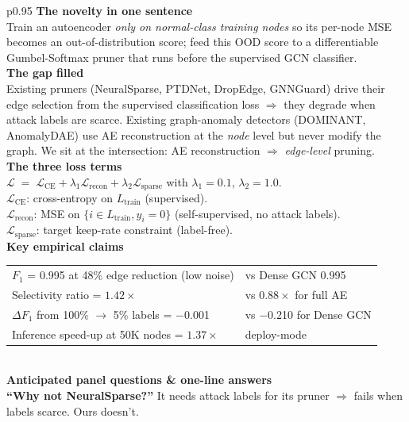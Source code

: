 \documentclass[11pt,a4paper]{article}
\begin{document}
\begin{tabular}{p{}}
\toprule
\textbf{The novelty in one sentence}\\
Train an autoencoder \emph{only on normal-class training nodes} so its
per-node MSE becomes an out-of-distribution score; feed this OOD score
to a differentiable Gumbel-Softmax pruner that runs before the
supervised GCN classifier.\\
\midrule
\textbf{The gap filled}\\
Existing pruners (NeuralSparse, PTDNet, DropEdge, GNNGuard) drive their
edge selection from the supervised classification loss $\Rightarrow$
they degrade when attack labels are scarce. Existing graph-anomaly
detectors (DOMINANT, AnomalyDAE) use AE reconstruction at the
\emph{node} level but never modify the graph. We sit at the
intersection: AE reconstruction $\Rightarrow$ \emph{edge-level}
pruning.\\
\midrule
\textbf{The three loss terms}\\
$\mathcal{L} \;=\; \mathcal{L}_{\text{CE}}
+ \lambda_1 \mathcal{L}_{\text{recon}}
+ \lambda_2 \mathcal{L}_{\text{sparse}}$
\quad with $\lambda_1{=}0.1$, $\lambda_2{=}1.0$.\\[2pt]
$\mathcal{L}_{\text{CE}}$: cross-entropy on $L_{\text{train}}$
(supervised).\\
$\mathcal{L}_{\text{recon}}$: MSE on $\{i\in L_{\text{train}}, y_i=0\}$
(self-supervised, no attack labels).\\
$\mathcal{L}_{\text{sparse}}$: target keep-rate constraint
(label-free).\\
\midrule
\textbf{Key empirical claims}\\
\begin{tabular}{p{}p{}}
$F_1$ = 0.995 at 48\% edge reduction (low noise) & vs Dense GCN 0.995\\
Selectivity ratio = $1.42\times$ & vs $0.88\times$ for full AE\\
$\Delta F_1$ from 100\% $\to$ 5\% labels = $-$0.001 & vs $-$0.210 for Dense GCN\\
Inference speed-up at 50K nodes = $1.37\times$ & deploy-mode\\
\end{tabular}\\
\midrule
\textbf{Anticipated panel questions \& one-line answers}\\
\textbf{``Why not NeuralSparse?''} It needs attack labels for its pruner
$\Rightarrow$ fails when labels scarce. Ours doesn't.\\

\end{tabular}
\end{document}
